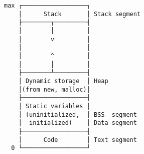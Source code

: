 \documentclass[varwidth,crop]{standalone}
\begin{document}
\begin{verbatim}
max ┌──────────────────┐
    │      Stack       │ Stack segment
    ├────────┬─────────┤    
    │        │         │
    │        v         │
    │                  │
    │        ^         │
    │        │         │
    ├────────┴─────────┤
    │ Dynamic storage  │ Heap
    │(from new, malloc)│
    ├──────────────────┤
    │ Static variables │ 
    │ (uninitialized,  │ BSS  segment
    │  initialized)    │ Data segment
    ├──────────────────┤
    │      Code        │ Text segment
  0 └──────────────────┘
\end{verbatim}
\end{document}
